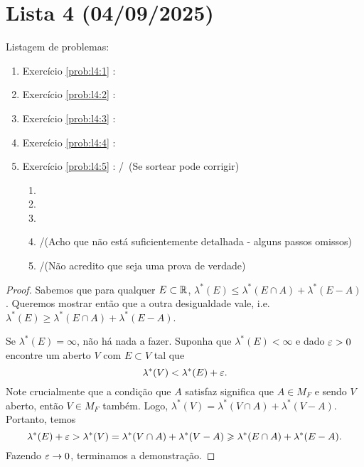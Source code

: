 \section{Lista 4 (04/09/2025)}

Listagem de problemas:
\begin{enumerate}
    \item Exercício \ref{prob:l4:1} : \checkmark
    \item Exercício \ref{prob:l4:2} : \checkmark
    \item Exercício \ref{prob:l4:3} : \checkmark
    \item Exercício \ref{prob:l4:4} : \checkmark
    \item Exercício \ref{prob:l4:5} : \checkmark/\Frowny\,  (Se sortear pode corrigir)
    \begin{enumerate}[label=(\alph*)]
        \item \checkmark
        \item \checkmark
        \item \checkmark
        \item \Frowny /\checkmark (Acho que não está suficientemente detalhada - alguns passos omissos)
        \item \Frowny/\checkmark (Não acredito que seja uma prova de verdade)
    \end{enumerate}
\end{enumerate}

\begin{problem}
    \label{prob:l4:1}
\end{problem}
\begin{proof}
    Sabemos que para qualquer $E \subset \mathbb{R}$, $\lambda^*(E) \leq \lambda^*(E \cap A) + \lambda^*(E - A)$.
    Queremos mostrar então que a outra desigualdade vale, i.e. $\lambda^*(E) \geq \lambda^*(E \cap A) + \lambda^*(E - A)$.
    
    Se $\lambda^*(E) = \infty$, não há nada a fazer. Suponha que $\lambda^*(E) < \infty$ e dado $\varepsilon > 0$
    encontre um aberto $V$ com $E \subset V$ tal que 
    $$\lambda^*(V) < \lambda^*(E) + \varepsilon .$$
    Note crucialmente que a condição que $A$ satisfaz significa que $A \in M_F$
    e sendo $V$ aberto, então $V \in M_F$ também. Logo, $\lambda^*(V) = \lambda^*(V \cap A) + \lambda^*(V - A)$.
    Portanto, temos 
    $$\lambda^*(E) + \varepsilon > \lambda^*(V) = \lambda^*(V \cap A) + \lambda^*(V - A) \geqslant \lambda^*(E \cap A) + \lambda^*(E - A).$$
    Fazendo $\varepsilon \rightarrow 0$, terminamos a demonstração.
\end{proof}

